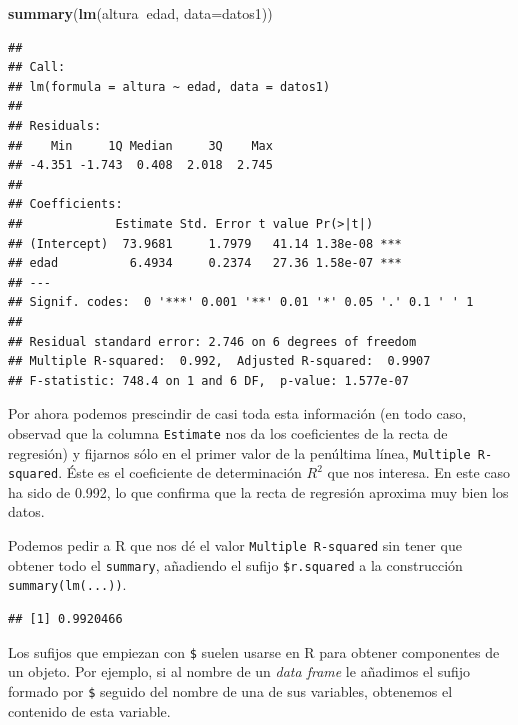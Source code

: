 \documentclass[]{book}
\newenvironment{Shaded}{\begin{snugshade}}{\end{snugshade}}
\newcommand{\DataTypeTok}[1]{\textcolor[rgb]{0.13,0.29,0.53}{#1}}
\newcommand{\KeywordTok}[1]{\textcolor[rgb]{0.13,0.29,0.53}{\textbf{#1}}}
\newcommand{\NormalTok}[1]{#1}
\newcommand{\OperatorTok}[1]{\textcolor[rgb]{0.81,0.36,0.00}{\textbf{#1}}}
\theoremstyle{definition}
\theoremstyle{definition}
\theoremstyle{definition}
\theoremstyle{remark}
\begin{document}
\begin{Shaded}
\begin{Highlighting}[]
\KeywordTok{summary}\NormalTok{(}\KeywordTok{lm}\NormalTok{(altura}\OperatorTok{~}\NormalTok{edad, }\DataTypeTok{data=}\NormalTok{datos1))}
\end{Highlighting}
\end{Shaded}

\begin{verbatim}
## 
## Call:
## lm(formula = altura ~ edad, data = datos1)
## 
## Residuals:
##    Min     1Q Median     3Q    Max 
## -4.351 -1.743  0.408  2.018  2.745 
## 
## Coefficients:
##             Estimate Std. Error t value Pr(>|t|)    
## (Intercept)  73.9681     1.7979   41.14 1.38e-08 ***
## edad          6.4934     0.2374   27.36 1.58e-07 ***
## ---
## Signif. codes:  0 '***' 0.001 '**' 0.01 '*' 0.05 '.' 0.1 ' ' 1
## 
## Residual standard error: 2.746 on 6 degrees of freedom
## Multiple R-squared:  0.992,  Adjusted R-squared:  0.9907 
## F-statistic: 748.4 on 1 and 6 DF,  p-value: 1.577e-07
\end{verbatim}

Por ahora podemos prescindir de casi toda esta información (en todo caso, observad que la columna \texttt{Estimate} nos da los coeficientes de la recta de regresión) y fijarnos sólo en el primer valor de la penúltima línea, \texttt{Multiple\ R-squared}. Éste es el coeficiente de determinación \(R^2\) que nos interesa. En este caso ha sido de 0.992, lo que confirma que la recta de regresión aproxima muy bien los datos.

Podemos pedir a R que nos dé el valor \texttt{Multiple\ R-squared} sin tener que obtener todo el \texttt{summary}, añadiendo el sufijo \texttt{\$r.squared} a la construcción \texttt{summary(lm(...))}.

\begin{Shaded}
\end{Shaded}

\begin{verbatim}
## [1] 0.9920466
\end{verbatim}

Los sufijos que empiezan con \texttt{\$} suelen usarse en R para obtener componentes de un objeto. Por ejemplo, si al nombre de un \emph{data frame} le añadimos el sufijo formado por \texttt{\$} seguido del nombre de una de sus variables, obtenemos el contenido de esta variable.
\end{document}
